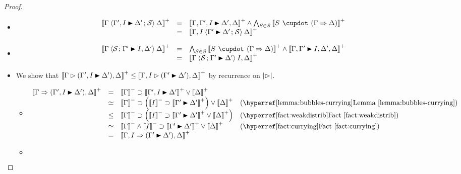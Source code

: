 \begin{proof}
\begin{itemize}
    \item[{\rsf{f{-}{\da}}}]
    $$
    \begin{array}{rcll}
      \psint{\Gamma \piq{\Gamma', I \JB \Delta' \sep \cS} \Delta}
      &=& \psint{\Gamma, \Gamma', I \JB \Delta', \Delta} \land \bigwedge_{S \in \cS}{\psint{S \mix (\Gamma \seq \Delta)}} & \\
      &=& \psint{\Gamma, I \piq{\Gamma' \JB \Delta' \sep \cS} \Delta} & \\
    \end{array}
    $$
    \item[{\rsf{f{+}{\da}}}]
    $$
    \begin{array}{rcll}
      \psint{\Gamma \piq{\cS \sep \Gamma' \JB I, \Delta'} \Delta}
      &=& \bigwedge_{S \in \cS}{\psint{S \mix (\Gamma \seq \Delta)}} \land \psint{\Gamma, \Gamma' \JB I, \Delta', \Delta} & \\
      &=& \psint{\Gamma \piq{\cS \sep \Gamma' \JB \Delta'} I, \Delta} & \\
    \end{array}
    $$
    \item[{\rsf{f{-}{+}{\da}}}]
    We show that $\psint{\Gamma \J (\Gamma', I \JB \Delta'), \Delta} \sement
    \psint{\Gamma, I \J (\Gamma' \JB \Delta'), \Delta}$ by recurrence on
    $\bradepth{\J}$.
    \begin{itemize}
      \item[\bcase]
      $$
      \begin{array}{rcll}
        \psint{\Gamma \seq (\Gamma', I \JB \Delta'), \Delta}
        &=& \nsint{\Gamma} \limp \psint{\Gamma', I \JB \Delta'} \lor \psint{\Delta} & \\
        &\semequiv& \nsint{\Gamma} \limp \left(\nsint{I} \limp \psint{\Gamma' \JB \Delta'}\right) \lor \psint{\Delta} &\text{(\reflemma{bubbles-currying})} \\
        &\sement& \nsint{\Gamma} \limp \left(\nsint{I} \limp \psint{\Gamma' \JB \Delta'} \lor \psint{\Delta}\right) &\text{(\reffact{weakdistrib})} \\
        &\semequiv& \nsint{\Gamma} \land \nsint{I} \limp \psint{\Gamma' \JB \Delta'} \lor \psint{\Delta} &\text{(\reffact{currying})} \\
        &=& \psint{\Gamma, I \seq (\Gamma' \JB \Delta'), \Delta} & \\
      \end{array}
      $$
      \item[\rcase]
      $$
      \begin{array}{rcll}

\end{array}$$
\end{itemize}
\end{itemize}
\end{proof}
